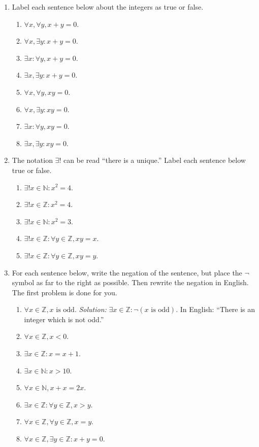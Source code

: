 \documentclass[11pt]{article}
\begin{document}
\begin{enumerate}
\item Label each sentence below about the integers as true or false.
\begin{enumerate}
\item $\forall x, \forall y, x+y=0.$
\item $\forall x, \exists y: x+y=0.$
\item $\exists x: \forall y, x+y=0.$
\item $\exists x, \exists y: x+y=0.$
\item $\forall x, \forall y, xy=0.$
\item $\forall x, \exists y: xy=0.$
\item $\exists x: \forall y, xy=0.$
\item $\exists x, \exists y: xy=0.$
\end{enumerate}
\item The notation $\exists!$ can be read ``there is a unique.'' Label each sentence below true or false.
\begin{enumerate}
\item $\exists! x \in \mathbb{N}: x^2=4.$
\item $\exists! x \in \mathbb{Z}: x^2=4.$
\item $\exists! x \in \mathbb{N}: x^2=3.$
\item $\exists! x \in \mathbb{Z}: \forall y \in \mathbb{Z}, xy=x.$
\item $\exists! x \in \mathbb{Z}: \forall y \in \mathbb{Z}, xy=y.$
\end{enumerate}
\item For each sentence below, write the negation of the sentence, but place the $\lnot$ symbol as far to the right as possible. Then rewrite the negation in English. The first problem is done for you.
\begin{enumerate}
\item $\forall x \in \mathbb{Z}, x \text{ is odd.}$ \textit{Solution:} $\exists x \in \mathbb{Z}: \lnot (x \text{ is odd})$. In English: ``There is an integer which is not odd.''
\item $\forall x \in \mathbb{Z}, x<0.$
\item $\exists x \in \mathbb{Z}: x=x+1.$
\item $\exists x \in \mathbb{N}: x>10.$
\item $\forall x \in \mathbb{N}, x+x=2x.$
\item $\exists x \in \mathbb{Z}: \forall y \in \mathbb{Z}, x>y.$
\item $\forall x \in \mathbb{Z}, \forall y \in \mathbb{Z}, x=y.$
\item $\forall x \in \mathbb{Z}, \exists y \in \mathbb{Z}: x+y=0.$
\end{enumerate}
\end{enumerate}
\end{document}
